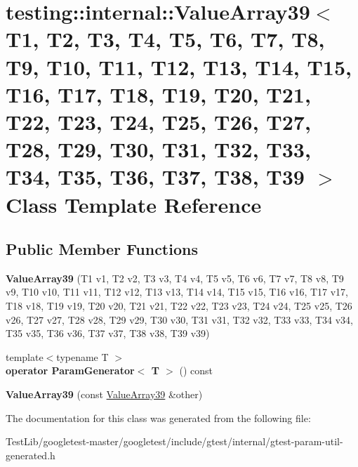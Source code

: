 \hypertarget{classtesting_1_1internal_1_1ValueArray39}{}\section{testing\+:\+:internal\+:\+:Value\+Array39$<$ T1, T2, T3, T4, T5, T6, T7, T8, T9, T10, T11, T12, T13, T14, T15, T16, T17, T18, T19, T20, T21, T22, T23, T24, T25, T26, T27, T28, T29, T30, T31, T32, T33, T34, T35, T36, T37, T38, T39 $>$ Class Template Reference}
\label{classtesting_1_1internal_1_1ValueArray39}
\subsection*{Public Member Functions}
\begin{DoxyCompactItemize}
\item 
\mbox{\label{classtesting_1_1internal_1_1ValueArray39_a4c64f12635a74e291c37d228330fbcb5}} 
{\bfseries Value\+Array39} (T1 v1, T2 v2, T3 v3, T4 v4, T5 v5, T6 v6, T7 v7, T8 v8, T9 v9, T10 v10, T11 v11, T12 v12, T13 v13, T14 v14, T15 v15, T16 v16, T17 v17, T18 v18, T19 v19, T20 v20, T21 v21, T22 v22, T23 v23, T24 v24, T25 v25, T26 v26, T27 v27, T28 v28, T29 v29, T30 v30, T31 v31, T32 v32, T33 v33, T34 v34, T35 v35, T36 v36, T37 v37, T38 v38, T39 v39)
\item 
\mbox{\label{classtesting_1_1internal_1_1ValueArray39_a08fd3f52f9b1dae3de5426196a296a8f}} 
{\footnotesize template$<$typename T $>$ }\\{\bfseries operator Param\+Generator$<$ T $>$} () const
\item 
\mbox{\label{classtesting_1_1internal_1_1ValueArray39_a355e7be366d16631b5119c545bd5f900}} 
{\bfseries Value\+Array39} (const \hyperlink{classtesting_1_1internal_1_1ValueArray39}{Value\+Array39} \&other)
\end{DoxyCompactItemize}


The documentation for this class was generated from the following file\+:\begin{DoxyCompactItemize}
\item 
Test\+Lib/googletest-\/master/googletest/include/gtest/internal/gtest-\/param-\/util-\/generated.\+h\end{DoxyCompactItemize}
